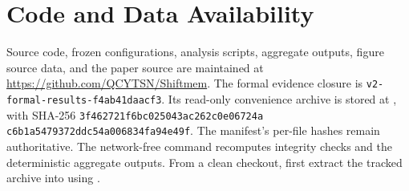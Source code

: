 \section*{Code and Data Availability}

Source code, frozen configurations, analysis scripts, aggregate outputs, figure
source data, and the paper source are maintained at
\url{https://github.com/QCYTSN/Shiftmem}. The formal evidence closure is
\texttt{v2-formal-results-f4ab41daacf3}. Its read-only convenience archive is
stored at
,
with SHA-256
\texttt{3f462721f6bc0250\allowbreak43ac262c0e06724a\allowbreak
c6b1a5479372ddc\allowbreak54a006834fa94e49f}.
The manifest's per-file hashes remain authoritative. The network-free command
recomputes integrity checks and the deterministic aggregate outputs. From a
clean checkout, first extract the tracked archive into
 using
.
